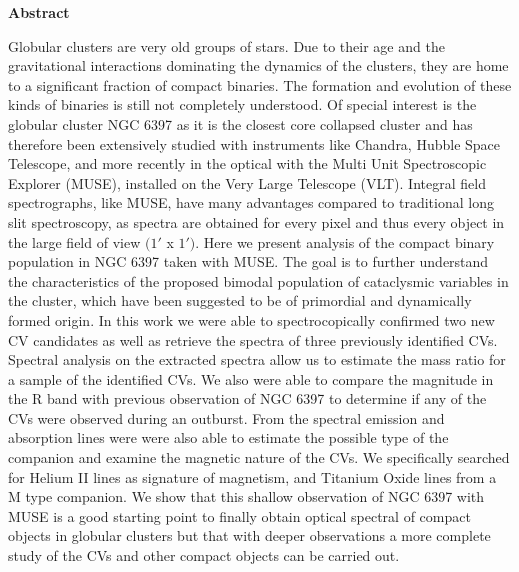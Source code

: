 \thispagestyle{empty}
\begin{Large}
\textbf{Abstract}
\end{Large}
\bigbreak
Globular clusters are very old groups of stars. Due to their age and the gravitational interactions dominating the dynamics of the clusters, they are home to a significant fraction of compact binaries. The formation
and evolution of these kinds of binaries is still not completely understood. Of special interest is the globular cluster NGC 6397 as it is the closest core collapsed cluster and has therefore been extensively studied
with instruments like Chandra, Hubble Space Telescope, and more recently in the optical with the Multi Unit Spectroscopic Explorer (MUSE), installed on the Very Large Telescope (VLT). Integral field spectrographs, like MUSE, have many advantages compared to traditional long slit spectroscopy, as spectra are obtained for every pixel and thus every object in the large field of view $(1'$ x $1')$. Here we present analysis of the compact binary population in NGC 6397 taken with MUSE. The goal is to further understand the characteristics of the proposed bimodal population of cataclysmic variables in the cluster, which have been suggested to be of primordial and dynamically formed origin. In this work we were able to spectrocopically confirmed two new CV candidates as well  as retrieve the spectra of three previously identified CVs. Spectral analysis on the extracted spectra allow us to estimate the mass ratio for a sample of the identified CVs. We also were able to compare the magnitude in the R band with previous observation of NGC 6397 to determine if any of the CVs were observed during an outburst. From the spectral emission and absorption lines were were also able to estimate the possible type of the companion and examine the magnetic nature of the CVs. We specifically searched for Helium II lines as signature of magnetism, and Titanium Oxide lines from a M type companion. We show that this shallow observation of NGC 6397 with MUSE is a good starting point to finally obtain optical spectral of compact objects in globular clusters but that with deeper observations a more complete study of the CVs and other compact objects can be carried out. 
\clearpage
